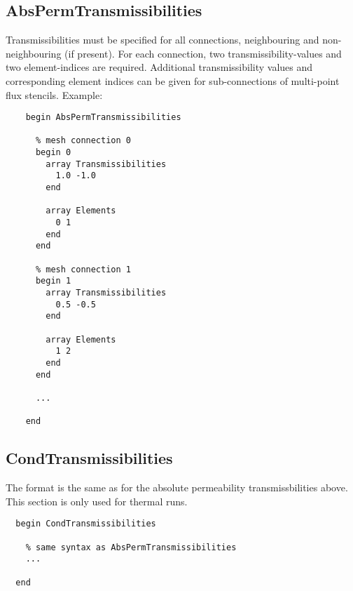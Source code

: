 \subsection{AbsPermTransmissibilities}
\label{sec:absp}
Transmissibilities must be specified for all connections, neighbouring
and non-neighbouring (if present). For each connection, two
transmissibility-values and two element-indices are required.
Additional transmissibility values and corresponding element indices
can be given for sub-connections of multi-point flux stencils.
Example:
%
\begin{verbatim}
    begin AbsPermTransmissibilities

      % mesh connection 0       
      begin 0
        array Transmissibilities
          1.0 -1.0
        end
      
        array Elements
          0 1
        end
      end

      % mesh connection 1
      begin 1                    
        array Transmissibilities
          0.5 -0.5
        end
      
        array Elements
          1 2
        end
      end

      ...

    end
\end{verbatim}
%

\subsection{CondTransmissibilities}
\label{sec:condtr}

The format is the same as for the absolute permeability
transmissbilities above. This section is only used for thermal runs.
%
\begin{verbatim}
  begin CondTransmissibilities

    % same syntax as AbsPermTransmissibilities
    ...

  end
\end{verbatim}
%



